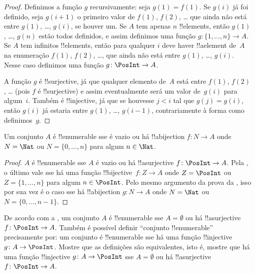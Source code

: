 \documentclass[../../../include/open-logic-section]{subfiles}
\begin{document}
\begin{proof}
  Definimos a função $g$ recursivamente: seja $g(1) = f(1)$. Se $g(i)$
  já foi definido, seja $g(i+1)$ o primeiro valor de $f(1)$,
  $f(2)$, \dots{} que ainda não está entre $g(1)$, \dots, $g(i)$, se houver
  um. Se $A$ tem apenas $n$ !!{element}s, então $g(1)$, \dots, $g(n)$ estão todos
  definidos, e assim definimos uma função $g\colon \{1, \dots, n\}
  \to A$. Se $A$ tem infinitos !!{element}s, então para qualquer $i$
  deve haver !!a{element} de~$A$ na enumeração $f(1)$, $f(2)$,
  \dots, que ainda não está entre $g(1)$, \dots, $g(i)$. Nesse
  caso definimos uma função $g\colon \PosInt \to A$.

  A função $g$ é !!{surjective}, já que qualquer elemento de~$A$ está
  entre $f(1)$, $f(2)$, \dots{} (pois $f$ é !!{surjective}) e assim
  eventualmente será um valor de~$g(i)$ para algum~$i$. Também é
  !!{injective}, já que se houvesse $j < i$ tal que $g(j) = g(i)$,
  então $g(i)$ já estaria entre $g(1)$, \dots, $g(i-1)$, contrariamente
  à forma como definimos~$g$.
\end{proof}

\begin{cor}
Um conjunto $A$ é !!{enumerable} sse é vazio ou há !!a{bijection}
$f\colon N \to A$ onde $N = \Nat$ ou $N = \{0, \dots, n\}$ para
algum $n \in \Nat$.
\end{cor}

\begin{proof}
$A$ é !!{enumerable} sse $A$ é vazio ou há !!a{surjective}
$f\colon \PosInt \to A$. Pela , o último vale
sse há uma função !!{bijective}~$f\colon Z \to A$ onde $Z =
\PosInt$ ou $Z = \{1, \dots, n\}$ para algum $n \in \PosInt$. Pelo
mesmo argumento da prova da , isso por sua vez
é o caso sse há !!a{bijection} $g\colon N \to A$ onde
$N = \Nat$ ou $N = \{0, \dots, n-1\}$.
\end{proof}

\begin{prob}
  De acordo com a , um conjunto $A$ é
  !!{enumerable} sse $A = \emptyset$ ou há !!a{surjective} $f\colon
  \PosInt \to A$. Também é possível definir ``conjunto !!{enumerable}''
  precisamente por: um conjunto é !!{enumerable} sse há uma função
  !!{injective} $g\colon A \to \PosInt$. Mostre que as definições são
  equivalentes, isto é, mostre que há uma função !!{injective}
  $g\colon A \to \PosInt$ sse $A = \emptyset$ ou há
  !!a{surjective} $f\colon \PosInt \to A$.
\end{prob}
\end{document}
